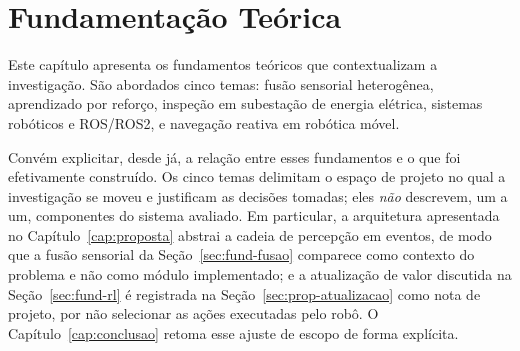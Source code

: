 \chapter{Fundamentação Teórica}
\label{cap:fundamentacao}

Este capítulo apresenta os fundamentos teóricos que contextualizam a investigação.
São abordados cinco temas: fusão sensorial heterogênea, aprendizado por reforço,
inspeção em subestação de energia elétrica, sistemas robóticos e ROS/ROS2, e
navegação reativa em robótica móvel.

Convém explicitar, desde já, a relação entre esses fundamentos e o que foi
efetivamente construído. Os cinco temas delimitam o espaço de projeto no qual a
investigação se moveu e justificam as decisões tomadas; eles \emph{não} descrevem,
um a um, componentes do sistema avaliado. Em particular, a arquitetura apresentada
no Capítulo~\ref{cap:proposta} abstrai a cadeia de percepção em eventos, de modo que
a fusão sensorial da Seção~\ref{sec:fund-fusao} comparece como contexto do problema
e não como módulo implementado; e a atualização de valor discutida na
Seção~\ref{sec:fund-rl} é registrada na Seção~\ref{sec:prop-atualizacao} como nota de
projeto, por não selecionar as ações executadas pelo robô. O Capítulo~\ref{cap:conclusao}
retoma esse ajuste de escopo de forma explícita.






